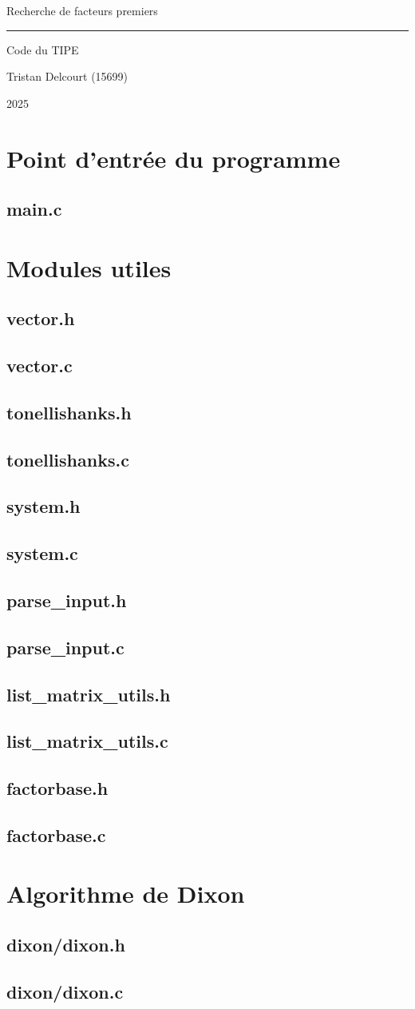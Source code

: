 \documentclass{article}
\newcommand{\importcode}[1]{
    \subsection{#1}
    
    \pagebreak
}
\begin{document}
\begin{titlepage}
    \begin{center}
        \vspace*{\fill}
        
        \fontsize{60pt}{62pt}\selectfont
        Recherche de facteurs premiers

        \vspace{1cm}
        
        \hrule
        
        \vspace{1cm}
        
        \fontsize{40pt}{41pt}\selectfont
        Code du TIPE

        \vspace{1cm}

        \huge
        Tristan Delcourt (15699)

        \vspace{10cm}

        \vspace*{\fill}

        \large
        2025

    \end{center}
\end{titlepage}

\renewcommand{\contentsname}{\huge Sommaire}
\begin{Large}
    \tableofcontents
\end{Large}
\pagebreak

\section{Point d'entrée du programme}
\importcode{main.c}


\section{Modules utiles}
\importcode{vector.h}
\importcode{vector.c}
\importcode{tonellishanks.h}
\importcode{tonellishanks.c}
\importcode{system.h}
\importcode{system.c}
\importcode{parse\_input.h}
\importcode{parse\_input.c}
\importcode{list\_matrix\_utils.h}
\importcode{list\_matrix\_utils.c}
\importcode{factorbase.h}
\importcode{factorbase.c}

\section{Algorithme de Dixon}
\importcode{dixon/dixon.h}
\importcode{dixon/dixon.c}
\end{document}
